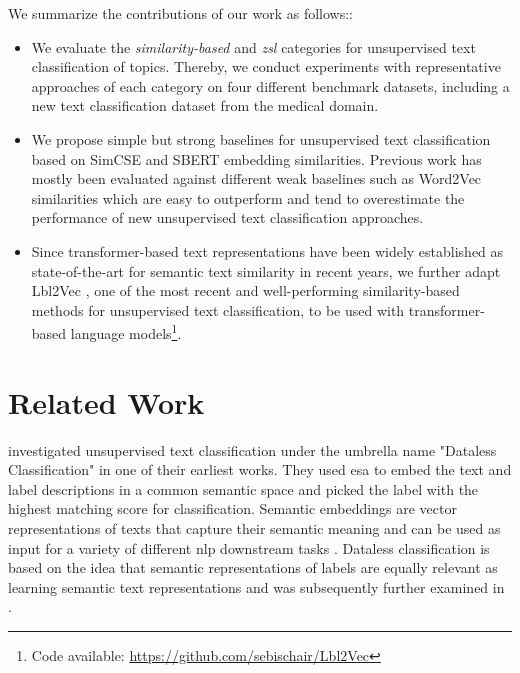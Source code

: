 \documentclass[sigconf]{acmart}
\begin{document}
We summarize the contributions of our work as follows::
\begin{itemize}
    \item We evaluate the \textit{similarity-based} and \textit{\acl{zsl}} categories for unsupervised text classification of topics. Thereby, we conduct experiments with representative approaches of each category on four different benchmark datasets, including a new text classification dataset from the medical domain.
    \item We propose simple but strong baselines for unsupervised text classification based on SimCSE \cite{gao-etal-2021-simcse} and SBERT \cite{reimers-gurevych-2019-sentence} embedding similarities. Previous work has mostly been evaluated against different weak baselines such as Word2Vec \cite{NIPS2013_9aa42b31} similarities which are easy to outperform and tend to overestimate the performance of new unsupervised text classification approaches.
    \item Since transformer-based text representations have been widely established as state-of-the-art for semantic text similarity in recent years, we further adapt Lbl2Vec \cite{webist21, schopf_lbl2vec_23}, one of the most recent and well-performing similarity-based methods for unsupervised text classification, to be used with transformer-based language models\footnote{{Code available: \url{https://github.com/sebischair/Lbl2Vec}}}.
\end{itemize}

\section{Related Work}

\citet{Chang2008ImportanceOS} investigated unsupervised text classification under the umbrella name "Dataless Classification" in one of their earliest works. They used \ac{esa} \cite{10.5555/1625275.1625535} to embed the text and label descriptions in a common semantic space and picked the label with the highest matching score for classification. Semantic embeddings are vector representations of texts that capture their semantic meaning and can be used as input for a variety of different \ac{nlp} downstream tasks \cite{10.1145/3460824.3460826,schneider-etal-2022-decade,schopf_etal_kdir22,10.1145/3535782.3535835}. Dataless classification is based on the idea that semantic representations of labels are equally relevant as learning semantic text representations and was subsequently further examined in \cite{Song_Roth_2014, 10.5555/2886521.2886630, li-etal-2016-joint, 10.5555/3060832.3061027}.
\end{document}
